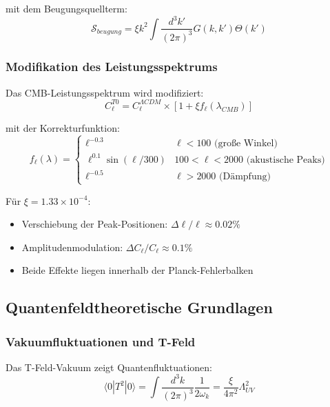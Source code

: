 \documentclass[12pt,a4paper]{article}
\theoremstyle{definition}
\begin{document}
mit dem Beugungsquellterm:
\begin{equation}
	\mathcal{S}_{beugung} = \xi k^2 \int \frac{d^3k'}{(2\pi)^3} G(k,k') \Theta(k')
\end{equation}

\subsubsection{Modifikation des Leistungsspektrums}

Das CMB-Leistungsspektrum wird modifiziert:
\begin{equation}
	C_\ell^{T0} = C_\ell^{\Lambda CDM} \times \left[1 + \xi f_\ell(\lambda_{CMB})\right]
\end{equation}

mit der Korrekturfunktion:
\begin{equation}
	f_\ell(\lambda) = \begin{cases}
		\ell^{-0.3} & \ell < 100 \text{ (große Winkel)} \\
		\ell^{0.1}\sin(\ell/300) & 100 < \ell < 2000 \text{ (akustische Peaks)} \\
		\ell^{-0.5} & \ell > 2000 \text{ (Dämpfung)}
	\end{cases}
\end{equation}

Für \(\xi = 1.33 \times 10^{-4}\):
\begin{itemize}
	\item Verschiebung der Peak-Positionen: \(\Delta\ell/\ell \approx 0.02\%\)
	\item Amplitudenmodulation: \(\Delta C_\ell/C_\ell \approx 0.1\%\)
	\item Beide Effekte liegen innerhalb der Planck-Fehlerbalken
\end{itemize}

\subsection{Quantenfeldtheoretische Grundlagen}
\label{subsec:qft_foundations}

\subsubsection{Vakuumfluktuationen und T-Feld}

Das T-Feld-Vakuum zeigt Quantenfluktuationen:
\begin{equation}
	\langle 0|T^2|0\rangle = \int \frac{d^3k}{(2\pi)^3} \frac{1}{2\omega_k} = \frac{\xi}{4\pi^2}\Lambda_{UV}^2
\end{equation}
\end{document}

